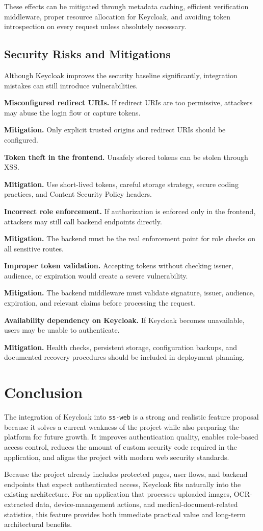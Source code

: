 \documentclass[conference]{IEEEtran}
\begin{document}
These effects can be mitigated through metadata caching, efficient verification middleware, proper resource allocation for Keycloak, and avoiding token introspection on every request unless absolutely necessary.

\subsection{Security Risks and Mitigations}

Although Keycloak improves the security baseline significantly, integration mistakes can still introduce vulnerabilities.

\textbf{Misconfigured redirect URIs.} If redirect URIs are too permissive, attackers may abuse the login flow or capture tokens.

\textbf{Mitigation.} Only explicit trusted origins and redirect URIs should be configured.

\textbf{Token theft in the frontend.} Unsafely stored tokens can be stolen through XSS.

\textbf{Mitigation.} Use short-lived tokens, careful storage strategy, secure coding practices, and Content Security Policy headers.

\textbf{Incorrect role enforcement.} If authorization is enforced only in the frontend, attackers may still call backend endpoints directly.

\textbf{Mitigation.} The backend must be the real enforcement point for role checks on all sensitive routes.

\textbf{Improper token validation.} Accepting tokens without checking issuer, audience, or expiration would create a severe vulnerability.

\textbf{Mitigation.} The backend middleware must validate signature, issuer, audience, expiration, and relevant claims before processing the request.

\textbf{Availability dependency on Keycloak.} If Keycloak becomes unavailable, users may be unable to authenticate.

\textbf{Mitigation.} Health checks, persistent storage, configuration backups, and documented recovery procedures should be included in deployment planning.

\section{Conclusion}

The integration of Keycloak into \texttt{ss-web} is a strong and realistic feature proposal because it solves a current weakness of the project while also preparing the platform for future growth. It improves authentication quality, enables role-based access control, reduces the amount of custom security code required in the application, and aligns the project with modern web security standards.

Because the project already includes protected pages, user flows, and backend endpoints that expect authenticated access, Keycloak fits naturally into the existing architecture. For an application that processes uploaded images, OCR-extracted data, device-management actions, and medical-document-related statistics, this feature provides both immediate practical value and long-term architectural benefits.
\end{document}
